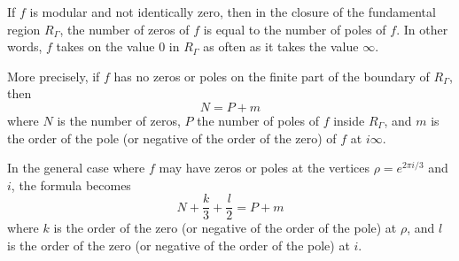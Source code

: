 If $f$ is modular and not identically zero, then in the closure of the fundamental region $R_{\Gamma}$, the number of zeros of $f$ is equal to the number of poles of $f$. In other words, $f$ takes on the value $0$ in $R_{\Gamma}$ as often as it takes the value $\infty$.

More precisely, if $f$ has no zeros or poles on the finite part of the boundary of $R_{\Gamma}$, then
$$N = P + m$$
where $N$ is the number of zeros, $P$ the number of poles of $f$ inside $R_{\Gamma}$, and $m$ is the order of the pole (or negative of the order of the zero) of $f$ at $i\infty$.

In the general case where $f$ may have zeros or poles at the vertices $\rho = e^{2\pi i/3}$ and $i$, the formula becomes
$$N + \frac{k}{3} + \frac{l}{2} = P + m$$
where $k$ is the order of the zero (or negative of the order of the pole) at $\rho$, and $l$ is the order of the zero (or negative of the order of the pole) at $i$.
